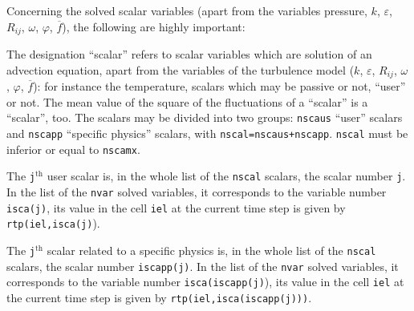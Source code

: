 {{{\bigskip

Concerning the solved scalar variables (apart from the variables
pressure, $k$, $\varepsilon$, $R_{ij}$, $\omega$, $\varphi$,
$\overline{f}$), the following are highly important:
\begin{list}{-}{}
\item The designation ``scalar'' refers to scalar variables which are
      solution of an advection equation, apart from the variables of the
      turbulence model  ($k$, $\varepsilon$, $R_{ij}$, $\omega$,
      $\varphi$, $\overline{f}$): for instance the temperature, scalars
      which may be passive or not, ``user'' or not. The mean value of
      the square of the fluctuations of a ``scalar'' is a
      ``scalar'', too. The scalars may be divided into two groups:
      \texttt{nscaus} ``user'' scalars and \texttt{nscapp}
      ``specific physics'' scalars, with
      \texttt{nscal=nscaus+nscapp}. \texttt{nscal} must be inferior or
       equal to \texttt{nscamx}.
\item The \texttt{j}$^{\text{th}}$ user scalar is, in
      the whole list of the \texttt{nscal} scalars, the scalar number
      \texttt{j}. In the list of the \texttt{nvar} solved variables, it
      corresponds to the variable number \texttt{isca(j)},
      its value in the cell \texttt{iel} at the current time step is given by
      \texttt{rtp(iel,isca(j)}).
\item The \texttt{j}$^{\text{th}}$ scalar related to a specific physics is, in
      the whole list of the \texttt{nscal} scalars, the scalar number
      \texttt{iscapp(j)}. In the list of the \texttt{nvar} solved variables, it
      corresponds to the variable number
      \texttt{isca(iscapp(j)}),
      its value in the cell \texttt{iel} at the current time step is given by
      \texttt{rtp(iel,isca(iscapp(j)))}.


\end{list}}}}
